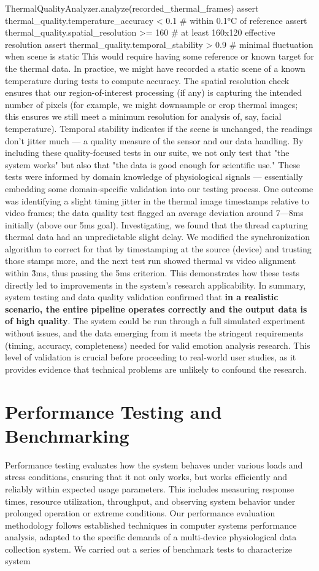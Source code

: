 ThermalQualityAnalyzer.analyze(recorded_thermal_frames) assert thermal_quality.temperature_accuracy < 0.1 # within 0.1°C of reference assert thermal_quality.spatial_resolution >= 160 # at least 160x120 effective resolution assert thermal_quality.temporal_stability > 0.9 # minimal fluctuation when scene is static This would require having some reference or known target for the thermal data. In practice, we might have recorded a static scene of a known temperature during tests to compute accuracy. The spatial resolution check ensures that our region-of-interest processing (if any) is capturing the intended number of pixels (for example, we might downsample or crop thermal images; this ensures we still meet a minimum resolution for analysis of, say, facial temperature). Temporal stability  indicates if the scene is unchanged, the readings don't jitter much --- a quality measure of the sensor and our data handling. By including these quality-focused tests in our suite, we not only test that "the system works" but also that "the data is good enough for scientific use." These tests were informed by domain knowledge of physiological signals --- essentially embedding some domain-specific validation into our testing process. One outcome was identifying a slight timing jitter in the thermal image timestamps relative to video frames; the data quality test flagged an average deviation around 7---8ms initially (above our 5ms goal). Investigating, we found that the thread capturing thermal data had an unpredictable slight delay. We modified the synchronization algorithm to correct for that by timestamping at the source (device) and trusting those stamps more, and the next test run showed thermal vs video alignment within \~3ms, thus passing the \<5ms criterion. This demonstrates how these tests directly led to improvements in the system's research applicability. In summary, system testing and data quality validation confirmed that \textbf{in a realistic scenario, the entire pipeline operates correctly and the output data is of high quality}. The system could be run through a full simulated experiment without issues, and the data emerging from it meets the stringent requirements (timing, accuracy, completeness) needed for valid emotion analysis research. This level of validation is crucial before proceeding to real-world user studies, as it provides evidence that technical problems are unlikely to confound the research. \section{Performance Testing and Benchmarking} Performance testing evaluates how the system behaves under various loads and stress conditions, ensuring that it not only works, but works efficiently and reliably within expected usage parameters. This includes measuring response times, resource utilization, throughput, and observing system behavior under prolonged operation or extreme conditions. Our performance evaluation methodology follows established techniques in computer systems performance analysis, adapted to the specific demands of a multi-device physiological data collection system. We carried out a series of benchmark tests to characterize system 